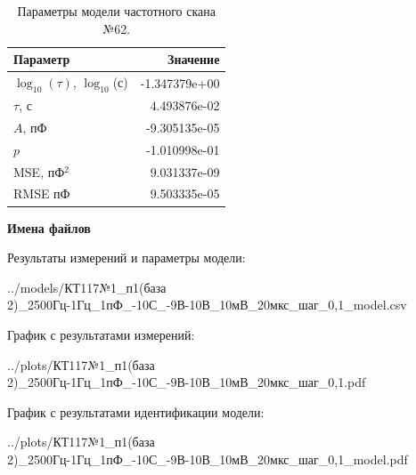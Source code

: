 \begin{table}[!ht]
    \centering
    \caption{Параметры модели частотного скана №62.}
    \begin{tabular}{|l|r|}
        \hline
        Параметр                                       & Значение                  \\ \hline
        $\log_{10}(\tau)$, $\log_{10}$(с)              & -1.347379e+00             \\ \hline
        $\tau$, с                                      & 4.493876e-02              \\ \hline
        $A$, пФ                                        & -9.305135e-05             \\ \hline
        $p$                                            & -1.010998e-01             \\ \hline
        MSE, пФ$^2$                                    & 9.031337e-09              \\ \hline
        RMSE пФ                                        & 9.503335e-05              \\ \hline
    \end{tabular}
    \label{table:frequency_scan_model_62}
\end{table}

\textbf{Имена файлов}

Результаты измерений и параметры модели:

\scriptsize../models/КТ117№1\_п1(база 2)\_2500Гц-1Гц\_1пФ\_-10С\_-9В-10В\_10мВ\_20мкс\_шаг\_0,1\_model.csv
\normalsize

График с результатами измерений:

\scriptsize../plots/КТ117№1\_п1(база 2)\_2500Гц-1Гц\_1пФ\_-10С\_-9В-10В\_10мВ\_20мкс\_шаг\_0,1.pdf
\normalsize

График с результатами идентификации модели:

\scriptsize../plots/КТ117№1\_п1(база 2)\_2500Гц-1Гц\_1пФ\_-10С\_-9В-10В\_10мВ\_20мкс\_шаг\_0,1\_model.pdf
\normalsize

